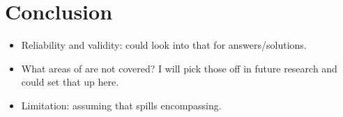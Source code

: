 	\section{Conclusion}
	\begin{itemize}
		\item Reliability and validity: could look into that for answers/solutions.
		\item What areas of \citet{George2016} are not covered? I will pick those off in future research and could set that up here.
		\item Limitation: assuming that spills encompassing.
	\end{itemize}